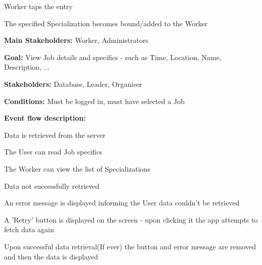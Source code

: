 \begin{packed_item}
\begin{packed_item}
						\item[] Worker taps the entry
						\item[] \begin{packed_enum}
							\item The specified Specialization becomes bound/added to the Worker
						\end{packed_enum}
					\end{packed_item}
					
				\end{packed_item}
			
				\noindent {}
				\begin{packed_item}
					\item \textbf{Main Stakeholders:} Worker, Administrators
					\item \textbf{Goal:} View Job details and specifics - such as Time, Location, Name, Description, ...
					\item \textbf{Stakeholders: } Database, Leader, Organiser
					\item \textbf{Conditions: } Must be logged in, must have selected a Job
					\item \textbf{Event flow description: }
					\begin{packed_enum}
						\item Data is retrieved from the server
						\item The User can read Job specifics
						\item The Worker can view the list of Specializations
					\end{packed_enum}
					
					\begin{packed_item}
						\item[0.a] Data not successfully retrieved
						\item[] \begin{packed_enum}
							\item An error message is displayed informing the User data couldn't be retrieved
							\item A 'Retry' button is displayed on the screen - upon clicking it the app attempts to fetch data again
							\item Upon successful data retrieval(If ever) the button and error message are removed and then the data is displayed
						\end{packed_enum}
					\end{packed_item}
				\end{packed_item}
			
